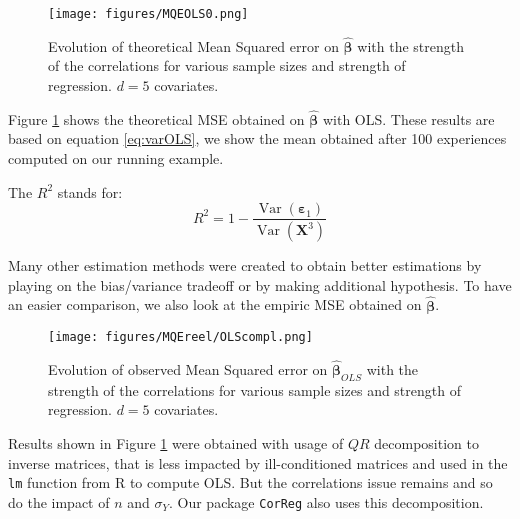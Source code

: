 \documentclass[12pt,a4paper]{report}
\begin{document}
		
	
	 \begin{figure}
	 \centering
	  \texttt{[image: figures/MQEOLS0.png]}
	  \caption{Evolution of theoretical Mean Squared error on $\hat{\boldsymbol{\beta}}$ with the strength of the correlations for various sample sizes and strength of regression. $d=5$ covariates. } \label{MQEOLS1}
	\end{figure}
	Figure \ref{MQEOLS1} shows the theoretical MSE obtained on $\hat{\boldsymbol{\beta}}$ with OLS. These results are based on equation \ref{eq:varOLS}, we show the mean obtained after 100 experiences computed on our running example.
	
	The $R^2$ stands for:
	\begin{equation}\label{defR2}
	R^2=1-\frac{\operatorname{Var}(\boldsymbol{\varepsilon}_1)}{\operatorname{Var}(\boldsymbol{X}^3)}
	\end{equation}
	
	
	Many other estimation methods were created to obtain better estimations by playing on the bias/variance tradeoff or by making additional hypothesis.
	To have an easier comparison, we also look at the empiric MSE obtained on $\hat{\boldsymbol{\beta}}$.
		\\
	
	 \begin{figure}
	 \centering
	  \texttt{[image: figures/MQEreel/OLScompl.png]}
	  \caption{Evolution of observed Mean Squared error on $\hat{\boldsymbol{\beta}}_{OLS}$ with the strength of the correlations for various sample sizes and strength of regression. $d=5$ covariates. } \label{MQEOLScompl}
	\end{figure}	
	Results shown in Figure \ref{MQEOLS1} were obtained with usage of $QR$ decomposition to inverse matrices, that is less impacted by ill-conditioned matrices \cite{bulirsch2002introduction} and used in the {\tt lm} function from R to compute OLS. But the correlations issue remains and so do the impact of $n$ and $\sigma_Y$.  Our package {\tt CorReg} also uses this decomposition.
	\\
		 \FloatBarrier
		
\end{document}
